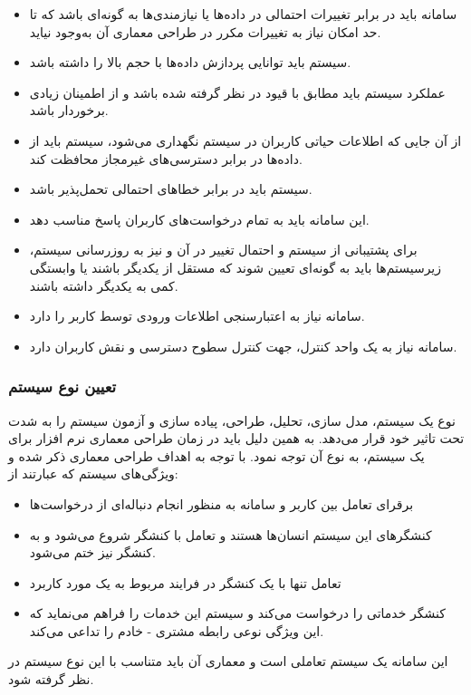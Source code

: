 \documentclass[12pt]{article}
\begin{document}
	\begin{itemize}
		\item
		سامانه باید در برابر تغییرات احتمالی در داده‌ها یا نیازمندی‌ها به گونه‌ای باشد که تا حد امکان نیاز به تغییرات مکرر در طراحی معماری آن به‌وجود نیاید.
		\item
سیستم باید توانایی پردازش داده‌ها با حجم بالا را داشته باشد.
		\item
		عملکرد سیستم باید مطابق با قیود در نظر گرفته شده باشد و از اطمینان زیادی برخوردار باشد.
		\item
		از آن جایی که اطلاعات حیاتی کاربران در سیستم نگهداری می‌شود، سیستم باید از داده‌ها در برابر دسترسی‌های غیرمجاز محافظت کند.
		\item
سیستم باید در برابر خطاهای احتمالی تحمل‌پذیر باشد.
		\item
این سامانه باید به تمام درخواست‌های کاربران پاسخ مناسب دهد.
		\item
		برای پشتیبانی از سیستم و احتمال تغییر در آن و نیز به روزرسانی سیستم، زیرسیستم‌ها باید به گونه‌ای تعیین شوند که مستقل از یکدیگر باشند یا وابستگی کمی به یکدیگر داشته باشند.
		\item
		سامانه نیاز به اعتبارسنجی اطلاعات ورودی توسط کاربر را دارد.
		\item
		سامانه نیاز به یک واحد کنترل، جهت کنترل سطوح دسترسی و نقش کاربران دارد.ُ
	\end{itemize}

	\subsubsection{تعیین نوع سیستم}
	نوع یک سیستم، مدل سازی، تحلیل، طراحی، پیاده سازی و آزمون سیستم را به شدت تحت تاثیر خود قرار می‌دهد. به همین دلیل باید در زمان طراحی معماری نرم افزار برای یک سیستم، به نوع آن توجه نمود.
	با توجه به اهداف طراحی معماری ذکر شده و ویژگی‌های سیستم که عبارتند از:

	\begin{itemize}
		\item برقرای تعامل بین کاربر و سامانه به منظور انجام دنباله‌ای از درخواست‌ها
		\item کنشگرهای این سیستم انسان‌ها هستند و تعامل با کنشگر شروع می‌شود و به کنشگر نیز ختم می‌شود.
		\item تعامل تنها با یک کنشگر در فرایند مربوط به یک مورد کاربرد
		\item کنشگر خدماتی را درخواست می‌کند و سیستم این خدمات را فراهم می‌نماید که این ویژگی نوعی رابطه مشتری - خادم را تداعی می‌کند.
	\end{itemize}
	این سامانه یک سیستم تعاملی است و معماری آن باید متناسب با این نوع سیستم در نظر گرفته شود.
\end{document}
